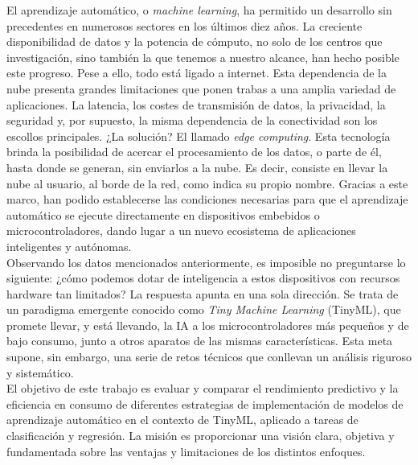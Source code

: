 \documentclass[a4paper,12pt,twoside,final]{book}
\begin{document}
El aprendizaje automático, o \textit{machine learning}, ha permitido un desarrollo sin precedentes en
numerosos sectores en los últimos diez años. La creciente disponibilidad de datos y la potencia de cómputo,
no solo de los centros que investigación, sino también la que tenemos a nuestro alcance, han hecho posible
este progreso. Pese a ello, todo está ligado a internet. Esta dependencia de la nube presenta grandes
limitaciones que ponen trabas a una amplia variedad de aplicaciones. La latencia, los costes de transmisión
de datos, la privacidad, la seguridad y, por supuesto, la misma dependencia de la conectividad son los
escollos principales. ¿La solución? El llamado \textit{edge computing}. Esta tecnología brinda la posibilidad
de acercar el procesamiento de los datos, o parte de él, hasta donde se generan, sin enviarlos a la nube. Es
decir, consiste en llevar la nube al usuario, al borde de la red, como indica su propio nombre. Gracias a este marco,
han podido establecerse las condiciones necesarias para que el aprendizaje automático se ejecute directamente
en dispositivos embebidos o microcontroladores, dando lugar a un nuevo ecosistema de aplicaciones inteligentes
y autónomas.\\

Observando los datos mencionados anteriormente, es imposible no preguntarse lo siguiente: ¿cómo podemos dotar
de inteligencia a estos dispositivos con recursos hardware tan limitados? La respuesta apunta en una sola
dirección. Se trata de un paradigma emergente conocido como \textit{Tiny Machine Learning} (TinyML),
que promete llevar, y está llevando, la IA a los microcontroladores más pequeños y de bajo consumo,
junto a otros aparatos de las mismas características. Esta meta supone, sin embargo, una serie de retos
técnicos que conllevan un análisis riguroso y sistemático.\\

El objetivo de este trabajo es evaluar y comparar el rendimiento predictivo y la eficiencia en consumo de
diferentes estrategias de implementación de modelos de aprendizaje automático en el contexto de TinyML,
aplicado a tareas de clasificación y regresión. La misión es proporcionar una visión clara, objetiva y
fundamentada sobre las ventajas y limitaciones de los distintos enfoques.\\
\end{document}
